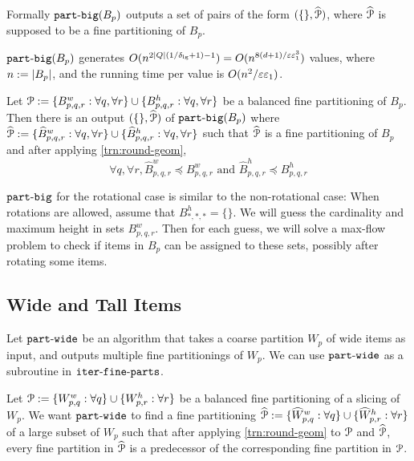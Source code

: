 Formally $\operatorname{\mathtt{part-big}}(B_p)$ outputs a set of pairs of the form $(\{\}, \widehat{\mathcal{P}})$,
where $\widehat{\mathcal{P}}$ is supposed to be a fine partitioning of $B_p$.

\begin{claim}
\label{claim:part-big-time}
$\operatorname{\mathtt{part-big}}(B_p)$ generates
$O(n^{2|Q|(1/\delta_{\mathrm{lg}}+1) - 1}) = O(n^{8(d+1)/\varepsilon\varepsilon_1^3})$
values, where $n := |B_p|$, and the running time per value is $O(n^2/\varepsilon\varepsilon_1)$.
\end{claim}

\begin{claim}
\label{lem:part-big}
Let $\mathcal{P} := \{B^w_{p,q,r}: \forall q, \forall r\} \cup \{B^h_{p,q,r}: \forall q, \forall r\}$
be a balanced fine partitioning of $B_p$.
Then there is an output $(\{\}, \widehat{\mathcal{P}})$ of $\operatorname{\mathtt{part-big}}(B_p)$ where
$\widehat{\mathcal{P}} := \{\widehat{B}^w_{p,q,r}: \forall q, \forall r\}
\cup \{\widehat{B}^h_{p,q,r}: \forall q, \forall r\}$ such that
$\widehat{\mathcal{P}}$ is a fine partitioning of $B_p$ and
after applying \cref{trn:round-geom},
\[ \forall q, \forall r, \widehat{B}^w_{p,q,r} \preceq B^w_{p,q,r}
\textrm{ and } \widehat{B}^h_{p,q,r} \preceq B^h_{p,q,r} \]
\end{claim}

$\operatorname{\mathtt{part-big}}$ for the rotational case is similar to the non-rotational case:
When rotations are allowed, assume \wLoG{} that $B^h_{*,*,*} = \{\}$.
We will guess the cardinality and maximum height in sets $B^w_{p,q,r}$.
Then for each guess, we will solve a max-flow problem to check if
items in $B_p$ can be assigned to these sets, possibly after rotating some items.

\subsection{Wide and Tall Items}

Let $\operatorname{\mathtt{part-wide}}$ be an algorithm that takes a coarse partition $W_p$
of wide items as input, and outputs multiple fine partitionings of $W_p$.
We can use $\operatorname{\mathtt{part-wide}}$ as a subroutine in $\operatorname{\mathtt{iter-fine-parts}}$.

Let $\mathcal{P} := \{W_{p,q}^w: \forall q\} \cup \{W_{p,r}^h: \forall r\}$ be
a balanced fine partitioning of a slicing of $W_p$.
We want $\operatorname{\mathtt{part-wide}}$ to find a fine partitioning
$\widehat{\mathcal{P}} := \{\widehat{W}_{p,q}^w: \forall q\} \cup \{\widehat{W}_{p,r}^h: \forall r\}$
of a large subset of $W_p$ such that
after applying \cref{trn:round-geom} to $\mathcal{P}$ and $\widehat{\mathcal{P}}$,
every fine partition in $\widehat{\mathcal{P}}$ is a predecessor of
the corresponding fine partition in $\mathcal{P}$.

